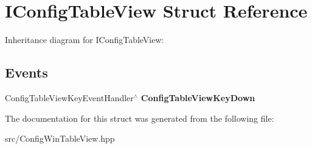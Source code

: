 \hypertarget{structIConfigTableView}{}\section{I\+Config\+Table\+View Struct Reference}
\label{structIConfigTableView}


Inheritance diagram for I\+Config\+Table\+View\+:
\subsection*{Events}
\begin{DoxyCompactItemize}
\item 
\mbox{\label{structIConfigTableView_a8b7504696537e2ef303fd731dd2df722}} 
Config\+Table\+View\+Key\+Event\+Handler$^\wedge$ {\bfseries Config\+Table\+View\+Key\+Down}
\end{DoxyCompactItemize}


The documentation for this struct was generated from the following file\+:\begin{DoxyCompactItemize}
\item 
src/Config\+Win\+Table\+View.\+hpp\end{DoxyCompactItemize}
